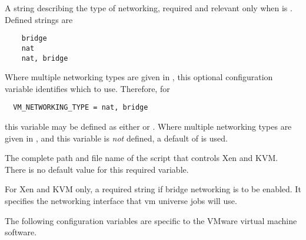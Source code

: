 \begin{description}
\label{param:VMNetworkingType}
\item[\Macro{VM\_NETWORKING\_TYPE}]
  A string describing the type of networking,
  required and relevant only when  is .
  Defined strings are
  \begin{verbatim}
    bridge
    nat
    nat, bridge
  \end{verbatim}

\label{param:VMNetworkingDefaultType}
\item[\Macro{VM\_NETWORKING\_DEFAULT\_TYPE}]
  Where multiple networking types are given in ,
  this optional configuration variable identifies which to use.
  Therefore, for 
  \begin{verbatim}
  VM_NETWORKING_TYPE = nat, bridge
  \end{verbatim}
  this variable may be defined as either  or .
  Where multiple networking types are given in ,
  and this variable is \emph{not} defined, a default of 
  is used.

\label{param:VMScript}
\item[\Macro{VM\_SCRIPT}]
  The complete path and file name of the script that controls Xen and KVM.
    There is no default value for this required variable.

\label{param:VMNetworkingBridgeInterface}
\item[\Macro{VM\_NETWORKING\_BRIDGE\_INTERFACE}]
  For Xen and KVM only, a required string if bridge networking is to be
  enabled.  It specifies the networking interface that vm universe jobs
  will use.
\end{description}

The following configuration variables are specific to the VMware
virtual machine software.

